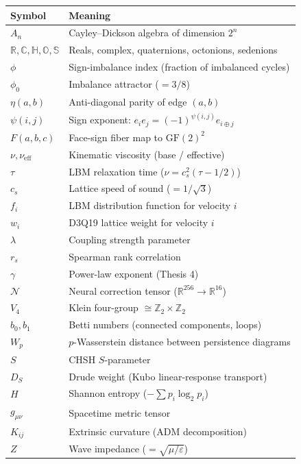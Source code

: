 \documentclass[12pt,openany]{report}
\theoremstyle{definition}
\theoremstyle{plain}
\theoremstyle{remark}
\begin{document}
\begin{center}
\begin{tabular}{ll}
\toprule
\textbf{Symbol} & \textbf{Meaning} \\
\midrule
$A_n$ & Cayley--Dickson algebra of dimension $2^n$ \\
$\mathbb{R}, \mathbb{C}, \mathbb{H}, \mathbb{O}, \mathbb{S}$ &
  Reals, complex, quaternions, octonions, sedenions \\
$\phi$ & Sign-imbalance index (fraction of imbalanced cycles) \\
$\phi_0$ & Imbalance attractor ($= 3/8$) \\
$\eta(a,b)$ & Anti-diagonal parity of edge $(a,b)$ \\
$\psi(i,j)$ & Sign exponent: $e_i e_j = (-1)^{\psi(i,j)} e_{i \oplus j}$ \\
$F(a,b,c)$ & Face-sign fiber map to $\mathrm{GF}(2)^2$ \\
$\nu, \nu_{\mathrm{eff}}$ & Kinematic viscosity (base / effective) \\
$\tau$ & LBM relaxation time ($\nu = c_s^2(\tau - 1/2)$) \\
$c_s$ & Lattice speed of sound ($= 1/\sqrt{3}$) \\
$f_i$ & LBM distribution function for velocity $i$ \\
$w_i$ & D3Q19 lattice weight for velocity $i$ \\
$\lambda$ & Coupling strength parameter \\
$r_s$ & Spearman rank correlation \\
$\gamma$ & Power-law exponent (Thesis 4) \\
$\mathcal{N}$ & Neural correction tensor ($\mathbb{R}^{256} \to \mathbb{R}^{16}$) \\
$V_4$ & Klein four-group $\cong \mathbb{Z}_2 \times \mathbb{Z}_2$ \\
$b_0, b_1$ & Betti numbers (connected components, loops) \\
$W_p$ & $p$-Wasserstein distance between persistence diagrams \\
$S$ & CHSH $S$-parameter \\
$D_S$ & Drude weight (Kubo linear-response transport) \\
$H$ & Shannon entropy ($-\sum p_i \log_2 p_i$) \\
$g_{\mu\nu}$ & Spacetime metric tensor \\
$K_{ij}$ & Extrinsic curvature (ADM decomposition) \\
$Z$ & Wave impedance ($= \sqrt{\mu/\varepsilon}$) \\
\bottomrule
\end{tabular}
\end{center}
\end{document}
